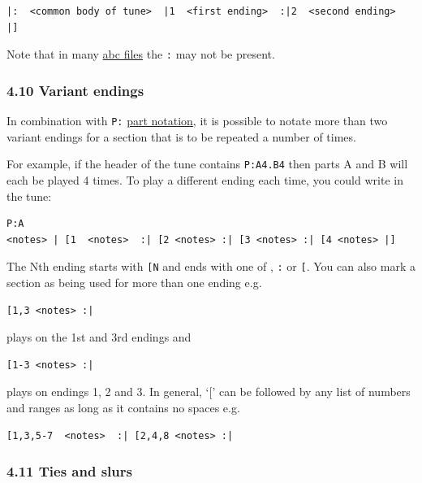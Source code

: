 \documentclass[oneside]{book}
\begin{document}
\begin{verbatim}
|:  <common body of tune>  |1  <first ending>  :|2  <second ending>  |]
\end{verbatim}

Note that in many \protect\hyperlink{abc_file_definition}{abc files} the
\texttt{\textbar{}:} may not be present.

\hypertarget{variant_endings}{\subsubsection{4.10 Variant
endings}\label{variant_endings}}

In combination with \texttt{P:} \protect\hyperlink{pparts}{part
notation}, it is possible to notate more than two variant endings for a
section that is to be repeated a number of times.

For example, if the header of the tune contains \texttt{P:A4.B4} then
parts A and B will each be played 4 times. To play a different ending
each time, you could write in the tune:

\begin{verbatim}
P:A
<notes> | [1  <notes>  :| [2 <notes> :| [3 <notes> :| [4 <notes> |]
\end{verbatim}

The Nth ending starts with \texttt{{[}N} and ends with one of
\texttt{\textbar{}\textbar{}}, \texttt{:\textbar{}}
\texttt{\textbar{}{]}} or \texttt{{[}\textbar{}}. You can also mark a
section as being used for more than one ending e.g.

\begin{verbatim}
[1,3 <notes> :|
\end{verbatim}

plays on the 1st and 3rd endings and

\begin{verbatim}
[1-3 <notes> :|
\end{verbatim}

plays on endings 1, 2 and 3. In general, `{[}' can be followed by any
list of numbers and ranges as long as it contains no spaces e.g.

\begin{verbatim}
[1,3,5-7  <notes>  :| [2,4,8 <notes> :|
\end{verbatim}

\hypertarget{ties_and_slurs}{\subsubsection{4.11 Ties and
slurs}\label{ties_and_slurs}}
\end{document}
